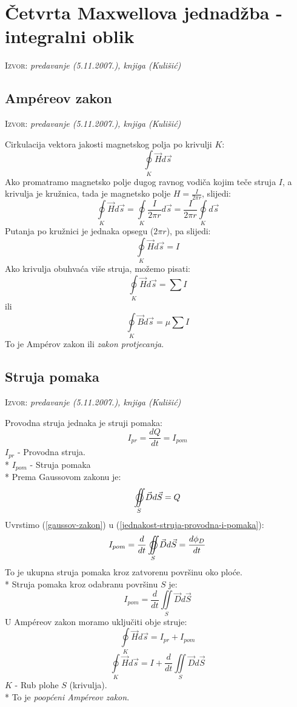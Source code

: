 \documentclass{report}
\begin{document}
\section{Četvrta Maxwellova jednadžba - integralni oblik}
\small \textsc{Izvor:} \textit{predavanje (5.11.2007.), knjiga (Kulišić)}

\subsection{Amp\'{e}reov zakon}
\small \textsc{Izvor:} \textit{predavanje (5.11.2007.), knjiga (Kulišić)}

Cirkulacija vektora jakosti magnetskog polja po krivulji $K$:
$$\oint\limits_K {\vec H d \vec s}$$
Ako promatramo magnetsko polje dugog ravnog vodiča kojim teče struja $I$, a krivulja je 
kružnica, tada je magnetsko polje $H = \frac{I}{2 \pi r}$, slijedi:
$$\oint\limits_K {\vec H d \vec s} = \oint\limits_K {\frac{I}{2 \pi r} d \vec s} = \frac{I}{2 \pi r} \oint\limits_K {d \vec s}$$
Putanja po kružnici je jednaka opsegu ($2 \pi r$), pa slijedi:
$$\oint\limits_K {\vec H d \vec s} = I$$
Ako krivulja obuhvaća više struja, možemo pisati:
$$\oint\limits_K {\vec H d \vec s} = \sum{I}$$
ili
$$\oint\limits_K {\vec B d \vec s} = \mu \sum{I}$$
To je Amp\'{e}rov zakon ili \textit{zakon protjecanja}.

\subsection{Struja pomaka}
\small \textsc{Izvor:} \textit{predavanje (5.11.2007.), knjiga (Kulišić)}

Provodna struja jednaka je struji pomaka:
\begin{equation}
	I_{pr} = \frac{dQ}{dt} = I_{pom}
	\label{jednakost-struja-provodna-i-pomaka}
\end{equation}
$I_{pr}$ - Provodna struja.\\*
$I_{pom}$ - Struja pomaka\\*
Prema Gaussovom zakonu je:
\begin{equation}
	\mathop{{\int\!\!\!\!\!\int}\mkern-21mu \bigcirc}\limits_S {\vec Dd\vec S} = Q
	\label{gaussov-zakon}
\end{equation}
Uvrstimo (\ref{gaussov-zakon}) u (\ref{jednakost-struja-provodna-i-pomaka}):
$$I_{pom} = \frac{d}{dt}\mathop{{\int\!\!\!\!\!\int}\mkern-21mu \bigcirc}\limits_S {\vec Dd\vec S} = \frac{d \phi _D}{dt}$$
To je ukupna struja pomaka kroz zatvorenu površinu oko ploće.\\*
Struja pomaka kroz odabranu površinu $S$ je:
$$I_{pom} = \frac{d}{dt} \iint\limits_S {\vec D d \vec S}$$
U Amp\'{e}reov zakon moramo uključiti obje struje:
$$\oint\limits_K {\vec H d \vec s} = I_{pr} + I_{pom}$$
\begin{equation}
	\oint\limits_K {\vec H d \vec s} = I + \frac{d}{dt} \iint\limits_S {\vec D d \vec S}
	\label{poopceni-amperov-zakon}
\end{equation}
$K$ - Rub plohe $S$ (krivulja).\\*
To je \textit{poopćeni Amp\'{e}reov zakon}.
\end{document}
